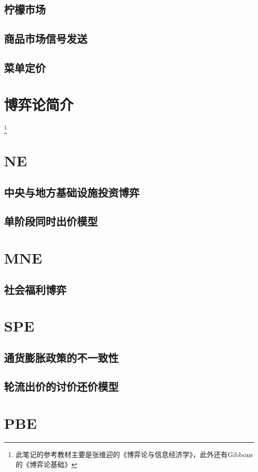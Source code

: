 \documentclass{article}
\begin{document}
\subsection{柠檬市场}
\subsection{商品市场信号发送}
\subsection{菜单定价}


\section{博弈论简介} \footnote{此笔记的参考教材主要是张维迎的《博弈论与信息经济学》，此外还有Gibbons的《博弈论基础》}
\section{NE}
\subsection{中央与地方基础设施投资博弈}

\subsection{单阶段同时出价模型}
\section{MNE}
\subsection{社会福利博弈}
\section{SPE}
\subsection{通货膨胀政策的不一致性}
\subsection{轮流出价的讨价还价模型}
\section{PBE}
\end{document}
